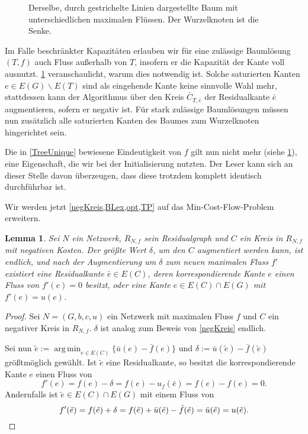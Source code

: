 \documentclass[a4paper,twoside,ngerman]{report}
\DeclareMathOperator*{\argmin}{arg\,min}
\theoremstyle{plain}
\newtheorem{lem}[thm]{Lemma}
\theoremstyle{definition}
\begin{document}
\begin{figure}[!ht]\centering
		
	\caption{Derselbe, durch gestrichelte Linien dargestellte Baum mit unterschiedlichen maximalen Flüssen. Der Wurzelknoten ist die Senke.}
	\label{fig:NSA}
\end{figure}

Im Falle beschränkter Kapazitäten erlauben wir für eine zulässige Baumlösung $(T,f)$ auch Fluss außerhalb von $T$, insofern er die Kapazität der Kante voll ausnutzt. \cref{fig:NSA} veranschaulicht, warum dies notwendig ist. Solche saturierten Kanten $e\in E(G)\backslash E(T)$ sind als eingehende Kante keine sinnvolle Wahl mehr, stattdessen kann der Algorithmus über den Kreis $\bar{C}_{T,\bar{e}}$ der Residualkante $\bar{e}$ augmentieren, sofern er negativ ist. Für stark zulässige Baumlösungen müssen nun zusätzlich alle saturierten Kanten des Baumes zum Wurzelknoten hingerichtet sein.

Die in \cref{TreeUnique} bewiesene Eindeutigkeit von $f$ gilt nun nicht mehr (siehe \cref{fig:NSA}), eine Eigenschaft, die wir bei der Initialisierung nutzten. Der Leser kann sich an dieser Stelle davon überzeugen, dass diese trotzdem komplett identisch durchführbar ist.

Wir werden jetzt \cref{negKreis,BLex,opt,TP} auf das Min-Cost-Flow-Problem erweitern.

\begin{lem}\label{negKreis2}Sei $N$ ein Netzwerk, $R_{N,f}$ sein Residualgraph und $C$ ein Kreis in $R_{N,f}$ mit negativen Kosten. Der größte Wert $\delta$, um den $C$ augmentiert werden kann, ist endlich, und nach der Augmentierung um $\delta$ zum neuen maximalen Fluss $f'$ existiert eine Residualkante $\bar{e}\in E(C)$, deren korrespondierende Kante $e$ einen Fluss von $f'(e)=0$ besitzt, oder eine Kante $e\in E(C)\cap E(G)$ mit $f'(e)=u(e)$.\end{lem}
\begin{proof}Sei $N=(G,b,c,u)$ ein Netzwerk mit maximalen Fluss $f$ und $C$ ein negativer Kreis in $R_{N,f}$. $\delta$ ist analog zum Beweis von \cref{negKreis} endlich.
	
Sei nun $\tilde{e}:=\argmin_{e\in E(C)}\{\bar{u}(e)-\bar{f}(e)\}$ und $\delta:=\bar{u}(\tilde{e})-\bar{f}(\tilde{e})$ größtmöglich gewählt. Ist $\tilde{e}$ eine Residualkante, so besitzt die korrespondierende Kante $e$ einen Fluss von
\begin{equation*}
f'(e)=f(e)-\delta=f(e)-u_f(\bar{e})=f(e)-f(e)=0.\end{equation*} Andernfalls ist $\tilde{e}\in E(C)\cap E(G)$ mit einem Fluss von
\begin{equation*}
f'(\tilde{e})=f(\tilde{e})+\delta=f(\tilde{e})+\bar{u}(\tilde{e})-\bar{f}(\tilde{e})=\bar{u}(\tilde{e})=u(\tilde{e}).\qedhere\end{equation*}\end{proof}
\end{document}
